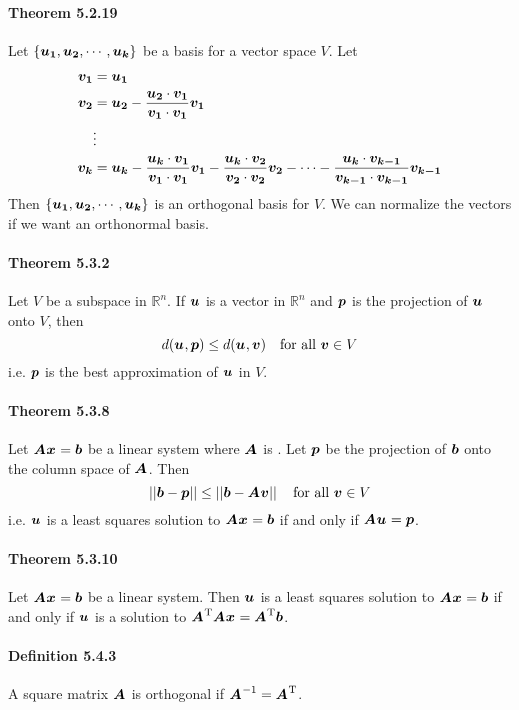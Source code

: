 \documentclass[a4paper]{article}
\newcommand{\R}{\mathbb{R}}
\newcommand{\inv}{^{-1}}
\begin{document}
\begin{multicols*}{3}
    \paragraph{Theorem 5.2.19} Let $\{\u[1], \u[2], \cdots, \u[k]\}$ be a basis for a vector space $V$. Let
      \begin{align*}
        \v[1] &= \u[1] \\
        \v[2] &= \u[2] - \dfrac{\u[2] \cdot \v[1]}{\v[1] \cdot \v[1]} \v[1] \\
              &\vdots \\
        \v[k] &= \u[k] - \dfrac{\u[k] \cdot \v[1]}{\v[1] \cdot \v[1]} \v[1] - \dfrac{\u[k] \cdot \v[2]}{\v[2] \cdot \v[2]} \v[2] - \cdots - \dfrac{\u[k] \cdot \v[k-1]}{\v[k-1] \cdot \v[k-1]} \v[k-1]
      \end{align*}
      Then $\{\u[1], \u[2], \cdots, \u[k]\}$ is an orthogonal basis for $V$. We can normalize the vectors if we want an orthonormal basis.
    \paragraph{Theorem 5.3.2} Let $V$ be a subspace in $\R^n$. If $\u$ is a vector in $\R^n$ and $\p$ is the projection of $\u$ onto $V$, then
      \begin{equation*}
        d(\u, \p) \leq d(\u, \v) \quad \text{for all } \v \in V
      \end{equation*}
      i.e. $\p$ is the best approximation of $\u$ in $V$.
    \paragraph{Theorem 5.3.8} Let $\A\x = \b$ be a linear system where $\A$ is . Let $\p$ be the projection of $\b$ onto the column space of $\A$. Then
      \begin{equation*}
        \vabs{\b-\p} \leq \vabs{\b - \A\v} \quad \text{for all } \v \in V
      \end{equation*}
      i.e. $\u$ is a least squares solution to $\A\x = \b$ if and only if $\A\u = \p$.
    \paragraph{Theorem 5.3.10} Let $\A\x = \b$ be a linear system. Then $\u$ is a least squares solution to $\A\x = \b$ if and only if $\u$ is a solution to $\A\tr\A\x = \A\tr\b$.
    \paragraph{Definition 5.4.3} A square matrix $\A$ is orthogonal if $\A\inv = \A\tr$.

\end{multicols*}
\end{document}
